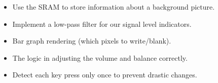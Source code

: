 \begin{itemize}
\item Use the SRAM to store information about a background picture.
\item Implement a low-pass filter for our signal level indicators. 
\item Bar graph rendering (which pixels to write/blank).
\item The logic in adjusting the volume and balance correctly.
\item Detect each key press only once to prevent drastic changes.
\end{itemize}